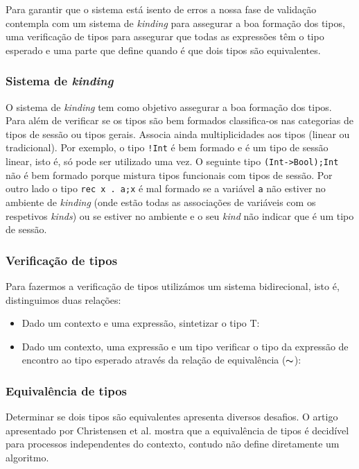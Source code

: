 Para garantir que o sistema está isento de erros a nossa fase de validação contempla com um sistema de \textit{kinding} para assegurar a boa formação dos tipos, uma verificação de tipos para assegurar que todas as expressões têm o tipo esperado e uma parte que define quando é que dois tipos são equivalentes.

\subsubsection{Sistema de \textit{kinding}}
O sistema de \textit{kinding} tem como objetivo assegurar a boa formação dos tipos. Para além de verificar se os tipos são bem formados classifica-os nas categorias de tipos de sessão ou tipos gerais. Associa ainda multiplicidades aos tipos (linear ou tradicional).
Por exemplo, o tipo \lstinline|!Int| é bem formado e é um tipo de sessão linear, isto é, só pode ser utilizado uma vez. O seguinte tipo \lstinline|(Int->Bool);Int| não é bem formado porque mistura tipos funcionais com tipos de sessão. Por outro lado o tipo \lstinline|rec x . a;x| é mal formado se a variável \lstinline|a| não estiver no ambiente de \textit{kinding} (onde estão todas as associações de variáveis com os respetivos \textit{kinds}) ou se estiver no ambiente e o seu \textit{kind} não indicar que é um tipo de sessão.

\subsubsection{Verificação de tipos}
\label{sec:typecheck}
Para fazermos a verificação de tipos utilizámos um sistema bidirecional, isto é, distinguimos duas relações:
\begin{itemize}
\item Dado um contexto e uma expressão, sintetizar o tipo T: 
\item Dado um contexto, uma expressão e um tipo verificar o tipo da expressão de encontro ao tipo esperado através da relação de equivalência ($\thicksim$):%
    
\end{itemize}

\subsubsection{Equivalência de tipos}

Determinar se dois tipos são equivalentes apresenta diversos desafios. O artigo apresentado por Christensen et al. \cite{decidable-CFP-bisimilarity} mostra que a equivalência de tipos é decidível para processos independentes do contexto, contudo não define diretamente um algoritmo.


